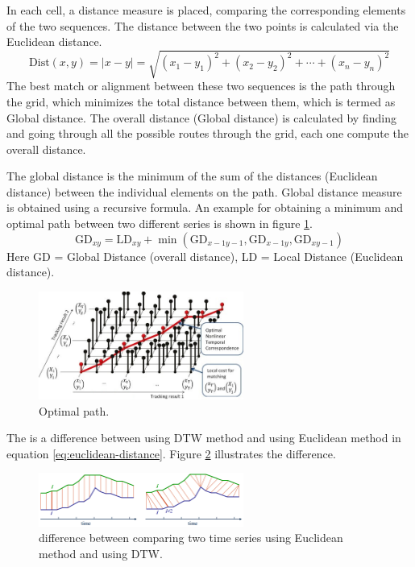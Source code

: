 \documentclass[12pt, a4paper, twoside]{report}
\begin{document}
In each cell, a distance measure is placed, comparing the corresponding elements of the two sequences. The distance between the two points is calculated via the Euclidean distance.
\begin{equation}
\text{Dist}(x, y) = |x - y| = \sqrt{(x_1 - y_1)^2 + (x_2 - y_2)^2 + \cdots + (x_n - y_n)^2}
\label{eq:euclidean-distance}
\end{equation}
The best match or alignment between these two sequences is the path through the grid, which minimizes the total distance between them, which is termed as Global distance. The overall distance (Global distance) is calculated by finding and going through all the possible routes through the grid, each one compute the overall distance.
\par
The global distance is the minimum of the sum of the distances (Euclidean distance) between the individual elements on the path. Global distance measure is obtained using a recursive formula. An example for obtaining a minimum and optimal path between two different series is shown in figure \ref{fig:dtw-optimal}.
\begin{equation}
\text{GD}_{xy} = \text{LD}_{xy} + \min(\text{GD}_{x-1y-1}, \text{GD}_{x-1y}, \text{GD}_{xy-1})
\end{equation}        
Here GD = Global Distance (overall distance), LD = Local Distance (Euclidean distance).
\begin{figure}[H]
	\centering
	\includegraphics[width=0.6\textwidth]
	{images/chapter4/dtw-optimal}
	\caption{Optimal path.}
	\label{fig:dtw-optimal}
\end{figure}

The is a difference between using DTW method and using Euclidean method in equation \ref{eq:euclidean-distance}. Figure \ref{fig:dtw-diff} illustrates the difference.
\begin{figure}[H]
	\centering
	\includegraphics[width=0.6\textwidth]
	{images/chapter4/dtw-diff}
	\caption{difference between comparing two time series using Euclidean method and using DTW.}
	\label{fig:dtw-diff}
\end{figure}
\end{document}

